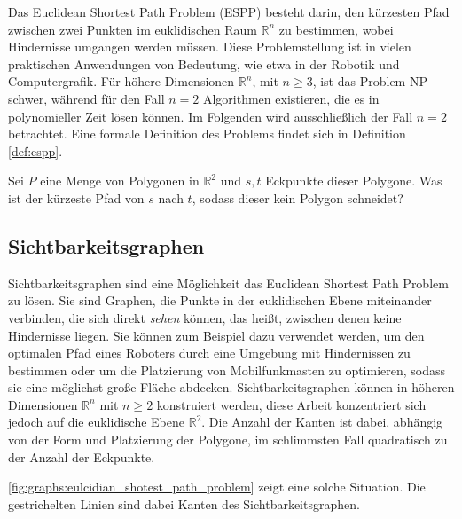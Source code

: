 Das Euclidean Shortest Path Problem (ESPP) besteht darin, den kürzesten Pfad zwischen zwei Punkten im euklidischen Raum $\mathbb{R}^n$ zu bestimmen, wobei Hindernisse umgangen werden müssen.
Diese Problemstellung ist in vielen praktischen Anwendungen von Bedeutung, wie etwa in der Robotik und Computergrafik.
Für höhere Dimensionen $\mathbb{R}^n$, mit $n \geq 3$, ist das Problem NP-schwer, während für den Fall $n = 2$ Algorithmen existieren, die es in polynomieller Zeit lösen können.
Im Folgenden wird ausschließlich der Fall $n = 2$ betrachtet.
Eine formale Definition des Problems findet sich in Definition \ref{def:espp}.

\begin{definition}\label{def:espp}
  Sei $P$ eine Menge von Polygonen in $\mathbb{R}^2$ und $s, t$ Eckpunkte dieser Polygone.
  Was ist der kürzeste Pfad von $s$ nach $t$, sodass dieser kein Polygon schneidet?
\end{definition}

\subsection{Sichtbarkeitsgraphen}

Sichtbarkeitsgraphen sind eine Möglichkeit das Euclidean Shortest Path Problem zu lösen.
Sie sind Graphen, die Punkte in der euklidischen Ebene miteinander verbinden, die sich direkt \emph{sehen} können, das heißt, zwischen denen keine Hindernisse liegen.
Sie können zum Beispiel dazu verwendet werden, um den optimalen Pfad eines Roboters durch eine Umgebung mit Hindernissen zu bestimmen oder um die Platzierung von Mobilfunkmasten zu optimieren, sodass sie eine möglichst große Fläche abdecken.
Sichtbarkeitsgraphen können in höheren Dimensionen $\mathbb{R}^n$ mit $n \geq 2$ konstruiert werden, diese Arbeit konzentriert sich jedoch auf die euklidische Ebene $\mathbb{R}^2$.
Die Anzahl der Kanten ist dabei, abhängig von der Form und Platzierung der Polygone, im schlimmsten Fall quadratisch zu der Anzahl der Eckpunkte.

\autoref{fig:graphs:eulcidian_shotest_path_problem} zeigt eine solche Situation.
Die gestrichelten Linien sind dabei Kanten des Sichtbarkeitsgraphen.

